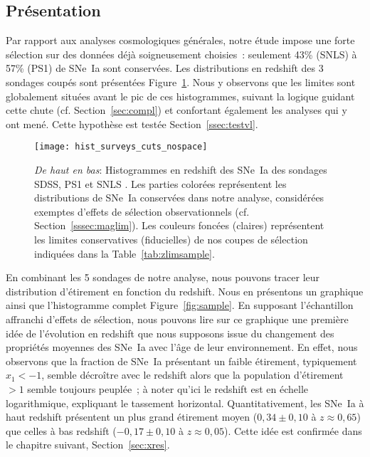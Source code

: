 \documentclass[../main/main.tex]{subfiles}
\begin{document}
\subsection{Présentation}\label{ssec:dataset}

Par rapport aux analyses cosmologiques générales, notre étude impose une forte
sélection sur des données déjà soigneusement choisies~: seulement 43\% (SNLS) à
57\% (PS1) de SNe~Ia sont conservées. Les distributions en redshift des 3
sondages coupés sont présentées Figure~\ref{fig:cuts}. Nous y observons que les
limites sont globalement situées avant le pic de ces histogrammes, suivant la
logique guidant cette chute (cf. Section~\ref{sec:compl}) et confortant
également les analyses qui y ont mené. Cette hypothèse est testée
Section~\ref{ssec:testvl}.

\begin{figure}
    \centering
    \texttt{[image: hist\_surveys\_cuts\_nospace]}
    \caption[Histogrammes des sondages coupés pour notre étude]{\textit{De haut
        en bas}: Histogrammes en redshift des SNe~Ia des sondages SDSS, PS1 et
        SNLS \citep[données de Pantheon,][]{scolnic2018}. Les parties colorées
        représentent les distributions de SNe~Ia conservées dans notre analyse,
        considérées exemptes d'effets de sélection observationnels (cf.
        Section~\ref{sssec:maglim}). Les couleurs foncées (claires) représentent
        les limites conservatives (fiducielles) de nos coupes de sélection
    indiquées dans la Table~\ref{tab:zlimsample}.}
    \label{fig:cuts}
\end{figure}

En combinant les 5 sondages de notre analyse, nous pouvons tracer leur
distribution d'étirement en fonction du redshift. Nous en présentons un
graphique ainsi que l'histogramme complet Figure~\ref{fig:sample}. En supposant
l'échantillon affranchi d'effets de sélection, nous pouvons lire sur ce
graphique une première idée de l'évolution en redshift que nous supposons issue
du changement des propriétés moyennes des SNe~Ia avec l'âge de leur
environnement. En effet, nous observons que la fraction de SNe~Ia présentant un
faible étirement, typiquement $x_1 < -1$, semble décroître avec le redshift alors
que la population d'étirement $> 1$ semble toujours peuplée~; à noter qu'ici le
redshift est en échelle logarithmique, expliquant le tassement horizontal.
Quantitativement, les SNe~Ia à haut redshift présentent un plus grand étirement
moyen ($0,34 \pm 0,10$ à $z \approx 0,65$) que celles à bas redshift ($-0,17 \pm
0,10$ à $z \approx 0,05$). Cette idée est confirmée dans le chapitre suivant,
Section~\ref{sec:xres}.
\end{document}
